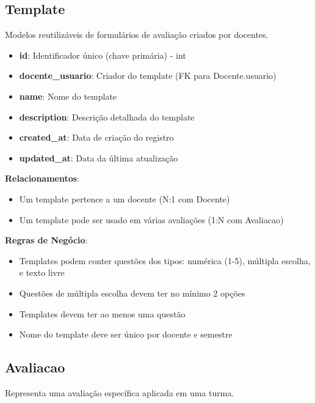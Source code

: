 \documentclass[a4paper,12pt]{article}
\begin{document}
\subsection{Template}

Modelos reutilizáveis de formulários de avaliação criados por docentes.

\begin{itemize}
    \item \textbf{id}: Identificador único (chave primária) - int
    \item \textbf{docente\_usuario}: Criador do template (FK para Docente.usuario)
    \item \textbf{name}: Nome do template
    \item \textbf{description}: Descrição detalhada do template
    \item \textbf{created\_at}: Data de criação do registro
    \item \textbf{updated\_at}: Data da última atualização
\end{itemize}

\textbf{Relacionamentos}:
\begin{itemize}
    \item Um template pertence a um docente (N:1 com Docente)
    \item Um template pode ser usado em várias avaliações (1:N com Avaliacao)
\end{itemize}

\textbf{Regras de Negócio}:
\begin{itemize}
    \item Templates podem conter questões dos tipos: numérica (1-5), múltipla escolha, e texto livre
    \item Questões de múltipla escolha devem ter no mínimo 2 opções
    \item Templates devem ter ao menos uma questão
    \item Nome do template deve ser único por docente e semestre
\end{itemize}

\subsection{Avaliacao}

Representa uma avaliação específica aplicada em uma turma.
\end{document}
